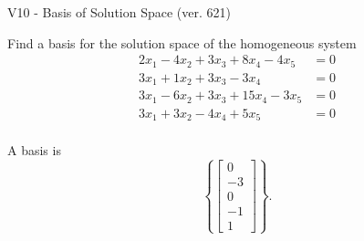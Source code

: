 \begin{exercise}
  \begin{exerciseTitle}V10 - Basis of Solution Space (ver. 621)\end{exerciseTitle}
  \begin{exerciseStatement}
    Find a basis for the solution space of the homogeneous system 
\begin{align*}
 2 x_ 1 -4 x_ 2 + 3 x_ 3 + 8 x_ 4 -4 x_ 5 &= 0  \\ 
  3 x_ 1 + 1 x_ 2 + 3 x_ 3 -3 x_ 4 &= 0  \\ 
  3 x_ 1 -6 x_ 2 + 3 x_ 3 + 15 x_ 4 -3 x_ 5 &= 0  \\ 
  3 x_ 1 + 3 x_ 2 -4 x_ 4 + 5 x_ 5 &= 0  \\ 
 \end{align*}


 
  \end{exerciseStatement}

  \begin{exerciseAnswer}
   A basis is   
\[\left\{\left[\begin{array}{c}
0 \\
-3 \\
0 \\
-1 \\
1
\end{array}\right]\right\}.\]

  


  \end{exerciseAnswer}
\end{exercise}